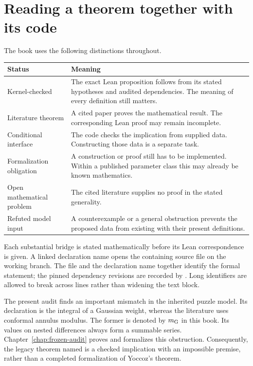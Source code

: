 \section*{Reading a theorem together with its code}

The book uses the following distinctions throughout.

\begin{center}\small
\begin{tabularx}{\textwidth}{@{}P{0.25\textwidth}Y@{}}
\textbf{Status} & \textbf{Meaning}\\
\hline
Kernel-checked &
The exact Lean proposition follows from its stated hypotheses and audited
dependencies.  The meaning of every definition still matters.\\
Literature theorem &
A cited paper proves the mathematical result.  The corresponding Lean
proof may remain incomplete.\\
Conditional interface &
The code checks the implication from supplied data.  Constructing those
data is a separate task.\\
Formalization obligation &
A construction or proof still has to be implemented.  Within a published
parameter class this may already be known mathematics.\\
Open mathematical problem &
The cited literature supplies no proof in the stated generality.\\
Refuted model input &
A counterexample or a general obstruction prevents the proposed data from
existing with their present definitions.\\
\end{tabularx}
\end{center}

Each substantial bridge is stated mathematically before its Lean
correspondence is given.  A linked declaration name opens the containing
source file on the working branch.  The file and the declaration name
together identify the formal statement; the pinned dependency revisions
are recorded by .  Long identifiers are allowed to
break across lines rather than widening the text block.

\begin{conditionalstep}
The present audit finds an important mismatch in the inherited puzzle
model.  Its declaration  is the integral of a
Gaussian weight, whereas the literature uses conformal annulus modulus.
The former is denoted by $m_{\mathrm G}$ in this book.  Its values on
nested differences always form a summable series.
Chapter~\ref{chap:frozen-audit} proves and formalizes this obstruction.
Consequently, the legacy theorem named
 is a checked implication with an impossible
premise, rather than a completed formalization of Yoccoz's theorem.
\end{conditionalstep}

